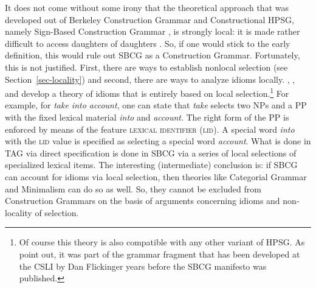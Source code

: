 \documentclass[output=paper,biblatex,babelshorthands,newtxmath,draftmode,colorlinks,citecolor=brown]{langscibook}
\begin{document}
\largerpage\enlargethispage{3pt}
It does not come without some irony that the theoretical approach that was developed out of Berkeley
Construction Grammar and Constructional HPSG, namely Sign-Based Construction Grammar
\citep*{SBK2012a,Sag2012a}, is strongly local: it is made rather difficult to access daughters of
daughters \citep{Sag2007a}. So, if one would stick to the early definition, this would rule out SBCG
as a Construction Grammar. Fortunately, this is not justified. First, there are ways to establish
nonlocal selection (see Section~\ref{sec-locality}) and second, there are ways to analyze idioms
locally. \citet{Sag2007a}, \citet*{KSF2015a}, and \citet{KM2019a} develop a theory of idioms that is
entirely based on local selection.\footnote{
  Of course this theory is also compatible with any other variant of HPSG. As
  \crossrefchaptert[\page \pageref{evolution:page-sbcg-vs-lingo}]{evolution} point out, it was part of the
  grammar fragment that has been developed at the CSLI by Dan Flickinger \citep*{FCS2000a,Flickinger2000a,Flickinger2011a-u} years
  before the SBCG manifesto was published.
} For example, for \emph{take into account}, one can state that
\emph{take} selects two NPs and a PP with the fixed lexical material \emph{into} and
\emph{account}. The right form of the PP is enforced by means of the feature \textsc{lexical
  identifier} (\textsc{lid}). A special word \emph{into} with the \textsc{lid} value  is
specified as selecting a special word \emph{account}. What is done in TAG via direct specification
is done in SBCG via a series of local selections of specialized lexical items. The interesting (intermediate)
conclusion is: if SBCG can account for idioms via local selection, then theories like Categorial
Grammar and Minimalism can do so as well. So, they cannot be excluded from Construction Grammars on
the basis of arguments concerning idioms and non-locality of selection.
\end{document}
